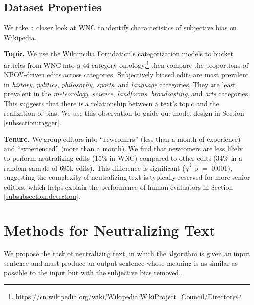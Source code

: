 \subsection{Dataset Properties}
\label{subsection:properties}
We take a closer look at WNC to identify characteristics of subjective bias on Wikipedia. 






\textbf{Topic.} We use the Wikimedia Foundation's categorization models \cite{asthana2018few} to bucket articles from WNC into a 44-category ontology,\footnote{\url{https://en.wikipedia.org/wiki/Wikipedia:WikiProject_Council/Directory}} then compare the  proportions of NPOV-driven edits across categories. Subjectively biased edits are  most prevalent in \emph{history}, \emph{politics}, \emph{philosophy}, \emph{sports}, and \emph{language} categories. They are  least prevalent in the \emph{meteorology}, \emph{science}, \emph{landforms}, \emph{broadcasting}, and \emph{arts} categories. This suggests that there is a relationship between a text's topic and the realization of bias. We use this observation to guide our model design in Section \ref{subsection:tagger}.






\textbf{Tenure.}
We group editors into ``newcomers'' (less than a month of experience) and ``experienced'' (more than a month). We find that newcomers are less likely to perform neutralizing edits (15\% in WNC) compared to other edits (34\% in a random sample of 685k edits). This difference is significant ($\tilde{\chi}^2$ p $=$ 0.001), suggesting the complexity of neutralizing text is typically reserved for more senior editors, which helps explain the performance of human evaluators in Section \ref{subsubsection:detection}.




\section{Methods for Neutralizing Text}

We propose the task of neutralizing text, in which the algorithm is given an input sentence and must produce an output sentence whose meaning is as similar as possible to the input but with the subjective bias removed.

